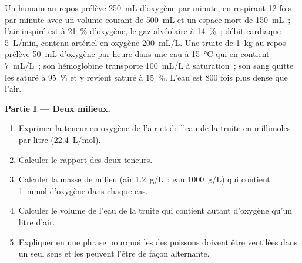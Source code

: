 \begin{problem}
\label{pb:b1:gas-exchange:1}
Un humain au repos prélève \qty{250}{mL} d'oxygène par minute, en
respirant \qty{12}{} fois par minute avec un volume courant de
\qty{500}{mL} et un espace mort de \qty{150}{mL}~; l'air inspiré est à
\qty{21}{\%} d'oxygène, le gaz alvéolaire à \qty{14}{\%}~; débit
cardiaque \qty{5}{L/min}, contenu artériel en oxygène \qty{200}{mL/L}.
Une truite de \qty{1}{kg} au repos prélève \qty{50}{mL} d'oxygène par
heure dans une eau à \qty{15}{\celsius} qui en contient \qty{7}{mL/L}~;
son hémoglobine transporte \qty{100}{mL/L} à saturation~; son sang
quitte les  saturé à \qty{95}{\%} et y revient saturé à
\qty{15}{\%}. L'eau est \qty{800}{} fois plus dense que l'air.

\medskip
\noindent\textbf{Partie I --- Deux milieux.}
\begin{enumerate}
  \item Exprimer la teneur en oxygène de l'air et de l'eau de la
        truite en millimoles par litre (\qty{22.4}{L/mol}).
  \item Calculer le rapport des deux teneurs.
  \item Calculer la masse de milieu (air \qty{1.2}{g/L}~; eau
        \qty{1000}{g/L}) qui contient \qty{1}{mmol} d'oxygène dans
        chaque cas.
  \item Calculer le volume de l'eau de la truite qui contient autant
        d'oxygène qu'un litre d'air.
  \item Expliquer en une phrase pourquoi les  des poissons
        doivent être ventilées dans un seul sens et les 
        peuvent l'être de façon alternante.
\end{enumerate}


\end{problem}
